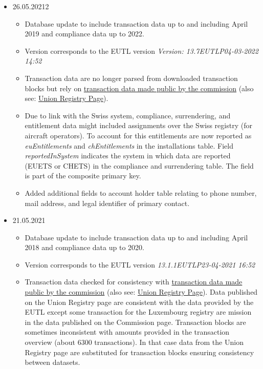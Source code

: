 \documentclass[authoryear]{elsarticle}
\begin{document}
\begin{itemize}
	\item 26.05.20212
	\begin{itemize}
		\item Database update to include transaction data up to and including April 2019 and compliance data up to 2022. 
		\item Version corresponds to the EUTL version \emph{Version: 13.7EUTLP04-03-2022 14:52}
		\item Transaction data are no longer parsed from downloaded transaction blocks but rely on  \href{https://ec.europa.eu/clima/document/download/0cda99f1-16f6-41e7-b190-887cd71339a4_en?filename=transactions_eutl_2022.zip}{transaction data made public by the commission} (also see: \href{https://ec.europa.eu/clima/eu-action/eu-emissions-trading-system-eu-ets/union-registry_en#tab-0-1}{Union Registry Page}).
		\item Due to link with the Swiss system, compliance, surrendering, and entitlement data might included assignments over the Swiss registry (for aircraft operators). To account for this entitlements are now reported as \emph{euEntitlements} and \emph{chEntitlements} in the installations table. Field \emph{reportedInSystem} indicates the system in which data are reported (EUETS or CHETS) in the compliance and surrendering table. The field is part of the composite primary key. 
		\item Added additional fields to account holder table relating to phone number, mail address, and legal identifier of primary contact.
	\end{itemize}	
	\item 21.05.2021
		\begin{itemize}
			\item Database update to include transaction data up to and including April 2018 and compliance data up to 2020. 
			\item Version corresponds to the EUTL version \emph{13.1.1EUTLP23-04-2021 16:52}
			\item Transaction data checked for consistency with \href{https://ec.europa.eu/clima/sites/default/files/ets/registry/docs/transactions_eutl_2021.zip}{transaction data made public by the commission} (also see: \href{https://ec.europa.eu/clima/policies/ets/registry_en#tab-0-1}{Union Registry Page}). Data published on the Union Registry page are consistent with the data provided by the EUTL except some transaction for the Luxembourg registry are mission in the data published on the Commission page. Transaction blocks are sometimes inconsistent with amounts provided in the transaction overview (about 6300 transactions). In that case data from the Union Registry page are substituted for transaction blocks ensuring consistency between datasets.  			
		\end{itemize}
\end{itemize}
\end{document}
